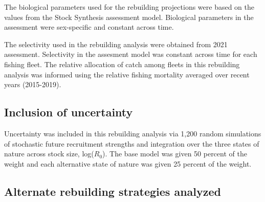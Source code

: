 \documentclass[11pt,
  english,
  a4paper,
]{article}
\begin{document}
\leavevmode\tagmcend\tagstructend


The biological parameters used for the rebuilding projections were based on the values from the Stock Synthesis assessment model. Biological parameters in the assessment were sex-specific and constant across time.

\leavevmode\tagmcend\tagstructend\par


The selectivity used in the rebuilding analysis were obtained from 2021 assessment. Selectivity in the assesment model was constant across time for each fishing fleet. The relative allocation of catch among fleets in this rebuilding analysis was informed using the relative fishing mortality averaged over recent years (2015-2019).

\leavevmode\tagmcend\tagstructend\par


\hypertarget{inclusion-of-uncertainty}{%
\subsection{Inclusion of uncertainty}\label{inclusion-of-uncertainty}}

\leavevmode\tagmcend\tagstructend


Uncertainty was included in this rebuilding analysis via 1,200 random simulations of stochastic future recruitment strengths and integration over the three states of nature across stock size, log({\(R_0\)\leavevmode\tagmcend\tagstructend}). The base model was given 50 percent of the weight and each alternative state of nature was given 25 percent of the weight.

\leavevmode\tagmcend\tagstructend\par


\hypertarget{alternate-rebuilding-strategies-analyzed}{%
\subsection{Alternate rebuilding strategies analyzed}\label{alternate-rebuilding-strategies-analyzed}}
\end{document}
